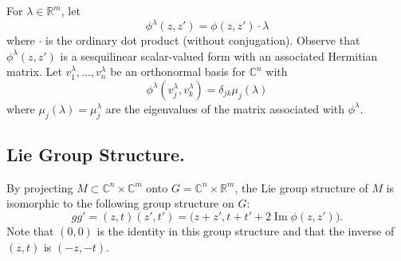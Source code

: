 \documentclass[12pt,reqno]{amsart}
\theoremstyle{definition}
\begin{document}
For 
$\lambda \in {\mathbb{R}}^m$, let
\[
\phi^\lambda (z,z') = \phi (z,z') \cdot \lambda
\]
where $\cdot$ is the ordinary dot product (without conjugation).
Observe that $\phi^\lambda (z,z') $
is a sesquilinear scalar-valued form with an associated Hermitian
matrix. Let $v^\lambda_1, \dots, v^\lambda_n$
be an orthonormal basis for ${\mathbb{C}}^n$ with 
\[
\phi^\lambda (v^\lambda_j, v^\lambda_k) = \delta_{jk} \mu_j (\lambda)
\]
where $\mu_j (\lambda) = {\mu^\lambda_j}$ are the eigenvalues of 
the matrix associated with $\phi^\lambda$.

\subsection{Lie Group Structure.}
By projecting $M \subset {\mathbb{C}}^n \times {\mathbb{C}}^m$ onto $G={\mathbb{C}}^n \times {\mathbb{R}}^m$,
the Lie group structure of $M$ is isomorphic to the following
group structure on $G$:
\[
g g'=(z,t)  (z', t') =\big(z+z', t+t' + 2\operatorname{Im} \phi (z,z') \big).
\]
Note that $(0,0)$ is the identity in this group
structure and that the inverse of $(z,t)$ is $(-z,-t)$.
\end{document}
